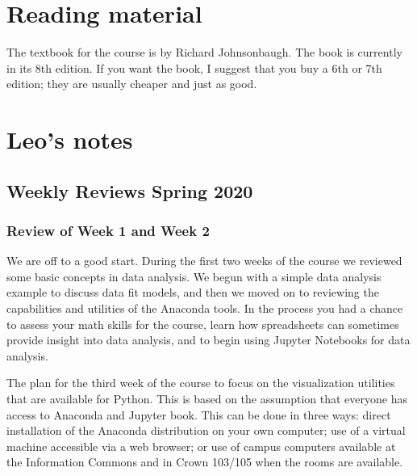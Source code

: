 \documentclass[letterpaper,10pt,english]{sphinxmanual}
\begin{document}
\section{Reading material}
\label{\detokenize{COMP180/reading:reading-material}}\label{\detokenize{COMP180/reading::doc}}
The  textbook for the course is  by Richard Johnsonbaugh. The book is currently in its 8th edition. If you want the book, I suggest that you buy a 6th or 7th edition; they are usually cheaper and just as good.


\section{Leo’s notes}
\label{\detokenize{COMP180/notes:leo-s-notes}}\label{\detokenize{COMP180/notes::doc}}

\subsection{Weekly Reviews \sphinxhyphen{} Spring 2020}
\label{\detokenize{COMP180/2020Spring/weeklyReviews:weekly-reviews-spring-2020}}\label{\detokenize{COMP180/2020Spring/weeklyReviews::doc}}

\subsubsection{Review of Week 1 and Week 2}
\label{\detokenize{COMP180/2020Spring/week2:review-of-week-1-and-week-2}}\label{\detokenize{COMP180/2020Spring/week2::doc}}
We are off to a good start. During the first two weeks of the course we reviewed some basic concepts in data analysis. We begun with a simple data analysis example to discuss data fit models, and then we moved on to reviewing the capabilities and utilities of the Anaconda tools. In the process you had a chance to assess your math skills for the course, learn how spreadsheets can sometimes provide insight into data analysis, and to begin using Jupyter Notebooks for data analysis.

The plan for the third week of the course to focus on the visualization utilities that are available for Python. This is based on the assumption that everyone has access to Anaconda and Jupyter book. This can be done in three ways: direct installation of the Anaconda distribution on your own computer; use of a virtual machine accessible via a web browser; or use of campus computers available at the Information Commons and in Crown 103/105 when the rooms are available.
\end{document}
